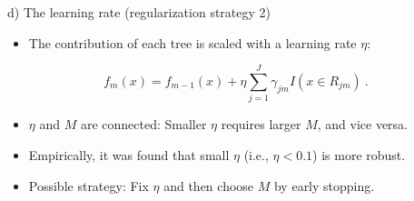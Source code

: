 \documentclass[
  10pt,
  ignorenonframetext,
]{beamer}
\providecommand{\tightlist}{%
  \setlength{\itemsep}{0pt}\setlength{\parskip}{0pt}}
\begin{document}
\begin{frame}
\begin{block}{d) The learning rate (regularization strategy 2)}
\protect\hypertarget{d-the-learning-rate-regularization-strategy-2}{}
\(~\)

\begin{itemize}
\tightlist
\item
  The contribution of each tree is scaled with a learning rate \(\eta\):
\end{itemize}

\[f_m(x) = f_{m-1}(x) + \eta \sum_{j=1}^J \gamma_{jm}I(x\in R_{jm}) \ .\]

\vspace{2mm}

\begin{itemize}
\tightlist
\item
  \(\eta\) and \(M\) are connected: Smaller \(\eta\) requires larger
  \(M\), and vice versa.
\end{itemize}

\vspace{2mm}

\begin{itemize}
\tightlist
\item
  Empirically, it was found that small \(\eta\) (i.e., \(\eta<0.1\)) is
  more robust.
\end{itemize}

\vspace{2mm}

\begin{itemize}
\tightlist
\item
  Possible strategy: Fix \(\eta\) and then choose \(M\) by early
  stopping.
\end{itemize}
\end{block}
\end{frame}
\end{document}
